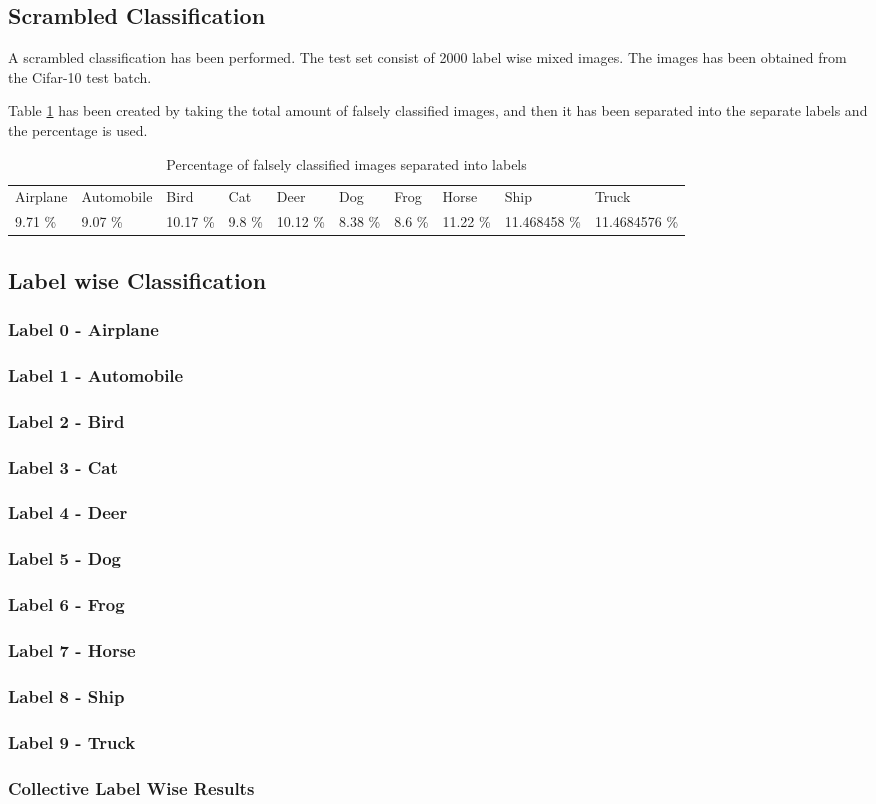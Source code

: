 \subsection{Scrambled Classification}
A scrambled classification has been performed. The test set consist of 2000 label wise mixed images. The images has been obtained from the Cifar-10 test batch.

Table \ref{table:falseclas} has been created by taking the total amount of falsely classified images, and then it has been separated into the separate labels and the percentage is used.
\begin{table}[]
	\centering
	\caption{Percentage of falsely classified images separated into labels }
	\label{table:falseclas}
	\begin{tabular}{llllllllll}
		Airplane & Automobile & Bird     & Cat    & Deer     & Dog     & Frog   & Horse    & Ship         & Truck         \\
		9.71 \%  & 9.07 \%    & 10.17 \% & 9.8 \% & 10.12 \% & 8.38 \% & 8.6 \% & 11.22 \% & 11.468458 \% & 11.4684576 \%
	\end{tabular}
\end{table}
\FloatBarrier
\subsection{Label wise Classification}
\subsubsection{Label 0 - Airplane}
\subsubsection{Label 1 - Automobile}
\subsubsection{Label 2 - Bird}
\subsubsection{Label 3 - Cat}
\subsubsection{Label 4 - Deer}
\subsubsection{Label 5 - Dog}
\subsubsection{Label 6 - Frog}
\subsubsection{Label 7 - Horse}
\subsubsection{Label 8 - Ship}
\subsubsection{Label 9 - Truck}
\subsubsection{Collective Label Wise Results}